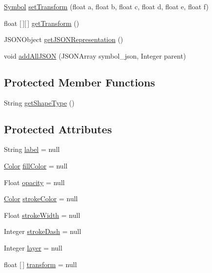 \begin{DoxyCompactItemize}
\item 
\hyperlink{classbridges_1_1base_1_1_symbol}{Symbol} \hyperlink{classbridges_1_1base_1_1_symbol_ac279dbc8b1e22e3aa64c8b529dbc46d2}{set\+Transform} (float a, float b, float c, float d, float e, float f)
\item 
float \mbox{[}$\,$\mbox{]}\mbox{[}$\,$\mbox{]} \hyperlink{classbridges_1_1base_1_1_symbol_a1660fd3420a9d16a0248bc56a459782e}{get\+Transform} ()
\item 
J\+S\+O\+N\+Object \hyperlink{classbridges_1_1base_1_1_symbol_aeba4cfa5b39fe03e72a568a8b7452e60}{get\+J\+S\+O\+N\+Representation} ()
\item 
void \hyperlink{classbridges_1_1base_1_1_symbol_ad27f1041dad61e288bba42e3c1cf4d52}{add\+All\+J\+S\+ON} (J\+S\+O\+N\+Array symbol\+\_\+json, Integer parent)
\end{DoxyCompactItemize}
\subsection*{Protected Member Functions}
\begin{DoxyCompactItemize}
\item 
String \hyperlink{classbridges_1_1base_1_1_symbol_a10f3cde5331f1af9303b08249e719a9d}{get\+Shape\+Type} ()
\end{DoxyCompactItemize}
\subsection*{Protected Attributes}
\begin{DoxyCompactItemize}
\item 
String \hyperlink{classbridges_1_1base_1_1_symbol_ad2adcc82e6a96c2f3c465702502655e9}{label} = null
\item 
\hyperlink{classbridges_1_1base_1_1_color}{Color} \hyperlink{classbridges_1_1base_1_1_symbol_a44f00712b6c584c7778ed9de4c394cbf}{fill\+Color} = null
\item 
Float \hyperlink{classbridges_1_1base_1_1_symbol_a7a01e5219d556a24e923885fe1646abb}{opacity} = null
\item 
\hyperlink{classbridges_1_1base_1_1_color}{Color} \hyperlink{classbridges_1_1base_1_1_symbol_a51a9a36983b00156284d86ca80cccfb0}{stroke\+Color} = null
\item 
Float \hyperlink{classbridges_1_1base_1_1_symbol_a9f90a6efb9cb7a2f4e38c46862ae5a95}{stroke\+Width} = null
\item 
Integer \hyperlink{classbridges_1_1base_1_1_symbol_a04134e835474c4747e334389f00513c0}{stroke\+Dash} = null
\item 
Integer \hyperlink{classbridges_1_1base_1_1_symbol_ad717768b1cd7510be1f4b9049fd04c1f}{layer} = null
\item 
float \mbox{[}$\,$\mbox{]} \hyperlink{classbridges_1_1base_1_1_symbol_a699a3e8ab079cb166e39d7edeeb8b174}{transform} = null
\end{DoxyCompactItemize}


